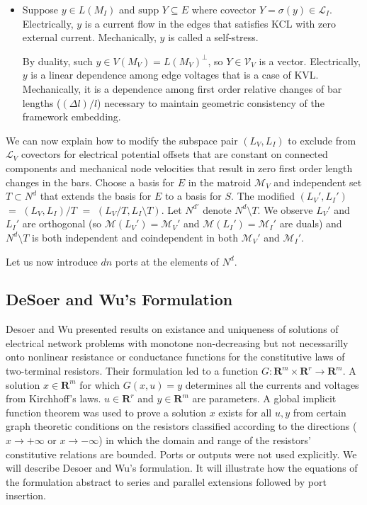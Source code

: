 \documentclass{amsproc-sunycstr}
\def\Reals{\ensuremath{\mathbf R}}
\theoremstyle{plain}
\theoremstyle{definition}
\theoremstyle{remark}
\newcommand{\supp}[1]{{{\mbox{supp\ }#1}}}
\begin{document}
{\begin{itemize}
\item Suppose $y\in L(M_I)$ and
$\supp{Y}\subseteq E$ where covector $Y=\sigma(y)\in\mathcal{L}_I$.
Electrically, $y$ is a current flow in the 
edges that satisfies KCL with zero external current.  Mechanically,
$y$ is called a self-stress.

By duality, such $y\in V(M_V)=L(M_V)^\perp$, so
$Y\in\mathcal{V}_V$ is a vector.  Electrically, $y$ is a linear dependence
among edge voltages that is a case of KVL.
Mechanically, it is a dependence among first order relative 
changes of bar lengths ($(\Delta l)/l$)
necessary to maintain geometric consistency of the framework embedding.

\end{itemize}

We can now explain how to modify the subspace pair $(L_V,L_I)$ to 
exclude from $\mathcal{L}_V$ covectors for electrical potential offsets that
are constant on connected components and mechanical node velocities that
result in zero first order length changes in the bars.  Choose a basis for
$E$ in the matroid $\mathcal{M}_V$ and independent set $T\subset N^d$ that 
extends the basis for $E$ to a basis for $S$.  The modified 
$(L_V',L_I')$ $=$ $(L_V,L_I)/T$ $=$ $(L_V/T,L_I\setminus T)$.  Let
$N^{d'}$ denote $N^d\setminus T$.  We observe $L_V'$ and $L_I'$ are orthogonal
(so $\mathcal{M}(L_V')=\mathcal{M}_V'$ and 
$\mathcal{M}(L_I')=\mathcal{M}_I'$ are duals)
and $N^d\setminus T$ is both independent and coindependent in both
$\mathcal{M}_V'$ and $\mathcal{M}_I'$.





Let us now introduce $dn$ ports at the elements of $N^d$.
}



\subsection{DeSoer and Wu's Formulation}

Desoer and Wu presented results\cite{DesoerWu} 
on existance and uniqueness of solutions of
electrical network problems with monotone non-decreasing but not necessarilly
onto nonlinear resistance or conductance functions for the constitutive
laws of two-terminal resistors.  Their formulation
led to a function $G:\Reals^m\times\Reals^r\rightarrow\Reals^m$.  A solution
$x\in\Reals^m$ for which $G(x,u)=y$ determines all the currents and
voltages from Kirchhoff's laws.  
$u\in\Reals^r$ and $y\in\Reals^m$ are parameters.  A global implicit function
theorem was used to prove a solution $x$ exists for all $u,y$ from 
certain graph theoretic conditions on the resistors
classified according to the directions ($x\rightarrow +\infty$ or
$x\rightarrow -\infty$) in which the domain and range
of the resistors' constitutive relations are bounded.
Ports or outputs were not used explicitly.  We will describe Desoer and
Wu's formulation.  It will illustrate how the equations of the 
formulation abstract to series and parallel extensions followed by 
port insertion.
\end{document}
